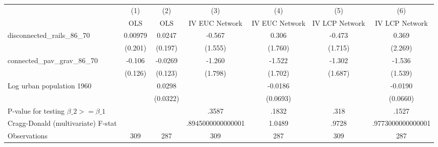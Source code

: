 {
\def\sym#1{\ifmmode^{#1}\else\(^{#1}\)\fi}
\begin{tabular}{l*{6}{c}}
\hline\hline
                &\multicolumn{1}{c}{(1)}&\multicolumn{1}{c}{(2)}&\multicolumn{1}{c}{(3)}&\multicolumn{1}{c}{(4)}&\multicolumn{1}{c}{(5)}&\multicolumn{1}{c}{(6)}\\
                &\multicolumn{1}{c}{OLS}&\multicolumn{1}{c}{OLS}&\multicolumn{1}{c}{IV EUC Network}&\multicolumn{1}{c}{IV EUC Network}&\multicolumn{1}{c}{IV LCP Network}&\multicolumn{1}{c}{IV LCP Network}\\
\hline
disconnected\_rails\_86\_70&  0.00979         &   0.0247         &   -0.567         &    0.306         &   -0.473         &    0.369         \\
                &  (0.201)         &  (0.197)         &  (1.555)         &  (1.760)         &  (1.715)         &  (2.269)         \\
[1em]
connected\_pav\_grav\_86\_70&   -0.106         &  -0.0269         &   -1.260         &   -1.522         &   -1.302         &   -1.536         \\
                &  (0.126)         &  (0.123)         &  (1.798)         &  (1.702)         &  (1.687)         &  (1.539)         \\
[1em]
Log urban population 1960&                  &   0.0298         &                  &  -0.0186         &                  &  -0.0190         \\
                &                  & (0.0322)         &                  & (0.0693)         &                  & (0.0660)         \\
\hline
P-value for testing $\beta\_{2} >= \beta\_{1}$&                  &                  &    .3587         &    .1832         &     .318         &    .1527         \\
Cragg-Donald (multivariate) F-stat&                  &                  &.8945000000000001         &   1.0489         &    .9728         &.9773000000000001         \\
Observations    &      309         &      287         &      309         &      287         &      309         &      287         \\
\hline\hline
\end{tabular}
}
